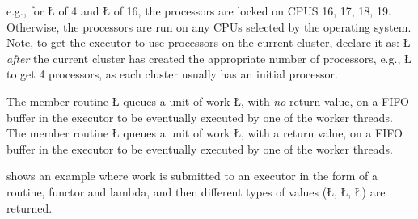 \documentclass[openright,twoside]{report}
\begin{document}
e.g., for \LGinlinetrue\LGbegin\lgrinde\L{}\endlgrinde\LGend{} of 4 and \LGinlinetrue\LGbegin\lgrinde\L{}\endlgrinde\LGend{} of 16, the processors are locked on CPUS 16, 17, 18, 19.
Otherwise, the processors are run on any CPUs selected by the operating system.
Note, to get the executor to use processors on the current cluster, declare it as:
\LGinlinefalse\LGbegin\lgrinde
\L{}
\endlgrinde\LGend
\emph{after} the current cluster has created the appropriate number of processors, e.g., \LGinlinetrue\LGbegin\lgrinde\L{}\endlgrinde\LGend{} to get 4 processors, as each cluster usually has an initial processor.

The member routine \LGinlinetrue\LGbegin\lgrinde\L{}\endlgrinde\LGend{} queues a unit of work \LGinlinetrue\LGbegin\lgrinde\L{}\endlgrinde\LGend{}, with \emph{no} return value, on a FIFO buffer in the executor to be eventually executed by one of the worker threads.
The member routine \LGinlinetrue\LGbegin\lgrinde\L{}\endlgrinde\LGend{} queues a unit of work \LGinlinetrue\LGbegin\lgrinde\L{}\endlgrinde\LGend{}, with a return value, on a FIFO buffer in the executor to be eventually executed by one of the worker threads.

 shows an example where work is submitted to an executor in the form of a routine, functor and lambda, and then different types of values (\LGinlinetrue\LGbegin\lgrinde\L{}\endlgrinde\LGend{}, \LGinlinetrue\LGbegin\lgrinde\L{}\endlgrinde\LGend{}, \LGinlinetrue\LGbegin\lgrinde\L{}\endlgrinde\LGend{}) are returned.
\end{document}
